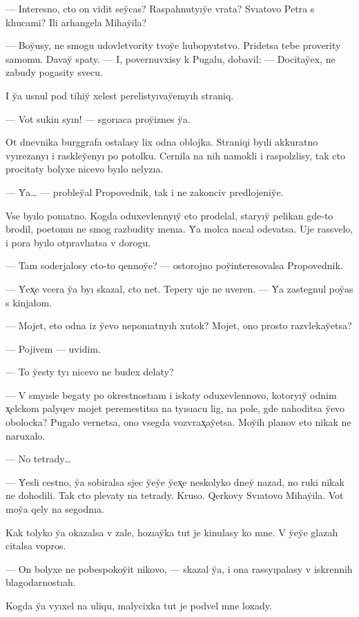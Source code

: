 \documentclass[10pt]{book}
\begin{document}
— Interesno, cto on vidit sey̆cas? Raspahnutyıy̆e vrata? Svıatovo Petra s klıucami? Ili arhangela Mihay̆ila?

— Boy̆usy, ne smogu udovletvority tvoy̆e lıubopyıtstvo. Pridetsa tebe proverity samomu. Davay̆ spaty. — I, povernuvxisy k Pugalu, dobavil: — Docitay̆ex, ne zabudy pogasity svecu.

I y̆a usnul pod tihiy̆ xelest perelistyıvay̆emyıh straniq.



— Vot sukin syın! — sgorıaca proy̆iznes y̆a.

Ot dnevnika burggrafa ostalasy lix odna oblojka. Straniqi byıli akkuratno vyırezanyı i raskley̆enyı po potolku. Cernila na nih namokli i raspolzlisy, tak cto procitaty bolyxe nicevo byılo nelyzıa.

— Y̆a… — probley̆al Propovednik, tak i ne zakonciv predlojeniy̆e.

Vse byılo ponıatno. Kogda oduxevlennyıy̆ eto prodelal, staryıy̆ pelikan gde-to brodil, poetomu ne smog razbudity menıa. Y̆a molca nacal odevatsa. Uje rassvelo, i pora byılo otpravlıatsa v dorogu.

— Tam soderjalosy cto-to qennoy̆e? — ostorojno poy̆interesovalsa Propovednik.

— Y̆ex̨e vcera y̆a byı skazal, cto net. Tepery uje ne uveren. — Y̆a zastegnul poy̆as s kinjalom.

— Mojet, eto odna iz y̆evo neponıatnyıh xutok? Mojet, ono prosto razvlekay̆etsa?

— Pojivem — uvidim.

— To y̆esty tyı nicevo ne budex delaty?

— V smyısle begaty po okrestnostıam i iskaty oduxevlennovo, kotoryıy̆ odnim x̨elckom palyqev mojet peremestitsa na tyısıacu lig, na pole, gde nahoditsa y̆evo obolocka? Pugalo vernetsa, ono vsegda vozvrax̨ay̆etsa. Moy̆ih planov eto nikak ne naruxalo.

— No tetrady…

— Y̆esli cestno, y̆a sobiralsa sjec y̆ey̆e y̆ex̨e neskolyko dney̆ nazad, no ruki nikak ne dohodili. Tak cto plevaty na tetrady. Kruso. Qerkovy Svıatovo Mihay̆ila. Vot moy̆a qely na segodnıa.

Kak tolyko y̆a okazalsa v zale, hozıay̆ka tut je kinulasy ko mne. V y̆ey̆e glazah citalsa vopros.

— On bolyxe ne pobespokoy̆it nikovo, — skazal y̆a, i ona rassyıpalasy v iskrennih blagodarnostıah.

Kogda y̆a vyıxel na uliqu, malycixka tut je podvel mne loxady.
\end{document}
